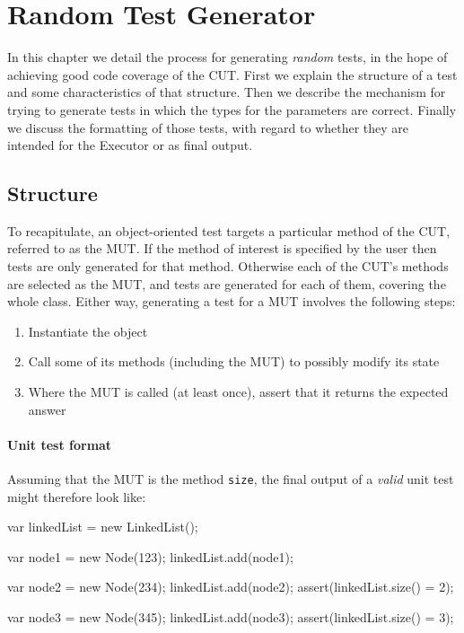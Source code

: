 \chapter{Random Test Generator}
\label{randomtest}
In this chapter we detail the process for generating \emph{random} tests, in the hope of achieving good code coverage of the CUT. First we explain the structure of a test and some characteristics of that structure. Then we describe the mechanism for trying to generate tests in which the types for the parameters are correct. Finally we discuss the formatting of those tests, with regard to whether they are intended for the \textsf{Executor} or as final output.

\section{Structure}

To recapitulate, an object-oriented test targets a particular method of the CUT, referred to as the MUT. If the method of interest is specified by the user then tests are only generated for that method. Otherwise each of the CUT's methods are selected as the MUT, and tests are generated for each of them, covering the whole class. Either way, generating a test for a MUT involves the following steps:

\begin{enumerate}
	\item Instantiate the object
	\item Call some of its methods (including the MUT) to possibly modify its state
	\item Where the MUT is called (at least once), assert that it returns the expected answer
\end{enumerate}

\subsubsection{Unit test format}
Assuming that the MUT is the method \texttt{size}, the final output of a \emph{valid} unit test might therefore look like:

\begin{code}[caption=Unit test format,label=final]
var linkedList = new LinkedList();

var node1 = new Node(123);
linkedList.add(node1);

var node2 = new Node(234);
linkedList.add(node2);
assert(linkedList.size() = 2);

var node3 = new Node(345);
linkedList.add(node3);
assert(linkedList.size() = 3);
\end{code}

